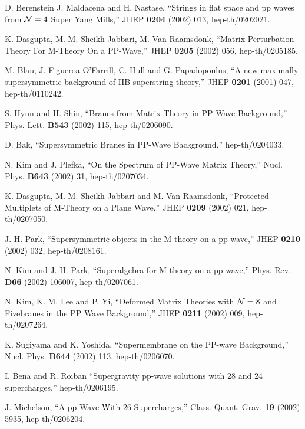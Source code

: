 \documentclass[a4paper,12pt]{article}
\numberwithin{equation}{section}
\begin{document}
\begin{thebibliography}{99}

 D. Berenstein J. Maldacena and H. Nastase, ``Strings
  in flat space and pp waves from ${\cal N} = 4$ Super Yang Mills,''
  JHEP {\bf 0204} (2002) 013, hep-th/0202021.

 K. Dasgupta, M. M. Sheikh-Jabbari, M. Van Raamsdonk,
  ``Matrix Perturbation Theory For M-Theory On a PP-Wave,'' JHEP {\bf
    0205} (2002) 056, hep-th/0205185.

 M. Blau, J. Figueroa-O'Farrill, C. Hull and G.
  Papadopoulus, ``A new maximally supersymmetric background of IIB
  superstring theory,'' JHEP {\bf 0201} (2001) 047, hep-th/0110242.

 S. Hyun and H. Shin, ``Branes from Matrix Theory in
  PP-Wave Background,'' Phys. Lett. {\bf B543} (2002) 115,
  hep-th/0206090.

 D. Bak, ``Supersymmetric Branes in PP-Wave
  Background,'' hep-th/0204033.

 N. Kim and J. Plefka, ``On the Spectrum of PP-Wave
  Matrix Theory,'' Nucl. Phys. {\bf B643} (2002) 31, hep-th/0207034.

 K. Dasgupta, M. M. Sheikh-Jabbari and M. Van
  Raamsdonk, ``Protected Multiplets of M-Theory on a Plane Wave,''
  JHEP {\bf 0209} (2002) 021, hep-th/0207050.

 J.-H. Park, ``Supersymmetric objects in the M-theory
  on a pp-wave,'' JHEP {\bf 0210} (2002) 032, hep-th/0208161.

 N. Kim and J.-H. Park, ``Superalgebra for M-theory on
  a pp-wave,'' Phys. Rev. {\bf D66} (2002) 106007, hep-th/0207061.

 N. Kim, K. M. Lee and P. Yi, ``Deformed Matrix
  Theories with ${\cal N}=8$ and Fivebranes in the PP Wave
  Background,'' JHEP {\bf 0211} (2002) 009, hep-th/0207264.

 K. Sugiyama and K. Yoshida, ``Supermembrane on the
  PP-wave Background,'' Nucl. Phys. {\bf B644} (2002) 113,
  hep-th/0206070.

 I. Bena and R. Roiban ``Supergravity pp-wave
  solutions with 28 and 24 supercharges,'' hep-th/0206195.

 J. Michelson, ``A pp-Wave With 26 Supercharges,''
  Class. Quant. Grav. {\bf 19} (2002) 5935, hep-th/0206204.


\end{thebibliography}
\end{document}
